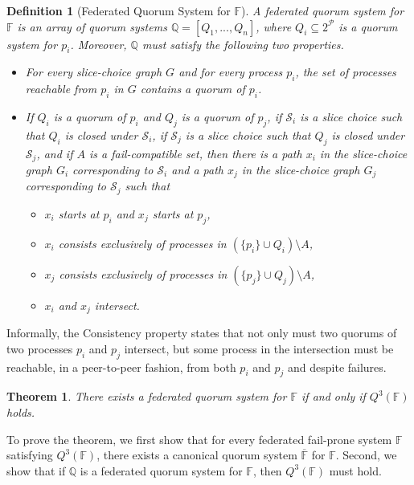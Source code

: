 \documentclass[11pt]{article}
\newtheorem{definition}{Definition}
\newtheorem{thm}{Theorem}
\begin{document}
\begin{definition}[Federated Quorum System for $\mathbb{F}$]
  A federated quorum system for $\mathbb{F}$ is an array of quorum systems $\mathbb{Q}=\left[Q_1,...,Q_n\right]$, where $Q_i\subseteq 2^\mathcal{P}$ is a quorum system for $p_i$. Moreover, $\mathbb{Q}$ must satisfy the following two properties.
  \begin{itemize}
    \item [Availability] For every slice-choice graph $G$ and for every process $p_i$, the set of processes reachable from $p_i$ in $G$ contains a quorum of $p_i$.
    \item[Consistency] If $Q_i$ is a quorum of $p_i$ and $Q_j$ is a quorum of $p_j$, if $\mathcal{S}_i$ is a slice choice such that $Q_i$ is closed under $\mathcal{S}_i$, if $\mathcal{S}_j$ is a slice choice such that $Q_j$ is closed under $\mathcal{S}_j$, and if $A$ is a fail-compatible set, then there is a path $x_i$ in the slice-choice graph $G_i$ corresponding to $\mathcal{S}_i$ and a path $x_j$ in the slice-choice graph $G_j$ corresponding to $\mathcal{S}_j$ such that
      \begin{itemize}
        \item $x_i$ starts at $p_i$ and $x_j$ starts at $p_j$,
        \item $x_i$ consists exclusively of processes in $\left(\{p_i\} \cup Q_i\right)\setminus A$,
        \item $x_j$ consists exclusively of processes in $\left(\{p_j\} \cup Q_j\right)\setminus A$,
        \item $x_i$ and $x_j$ intersect.
      \end{itemize}
  \end{itemize}
\end{definition}

Informally, the Consistency property states that not only must two quorums of two processes $p_i$ and $p_j$ intersect, but some process in the intersection must be reachable, in a peer-to-peer fashion, from both $p_i$ and $p_j$ and despite failures.

\begin{thm}
  There exists a federated quorum system for $\mathbb{F}$ if and only if $Q^3(\mathbb{F})$ holds.
\end{thm}

To prove the theorem, we first show that for every federated fail-prone system $\mathbb{F}$ satisfying $Q^3(\mathbb{F})$, there exists a canonical quorum system $\overline{\mathbb{F}}$ for $\mathbb{F}$. Second, we show that if $\mathbb{Q}$ is a federated quorum system for $\mathbb{F}$, then $Q^3(\mathbb{F})$ must hold.
\end{document}
